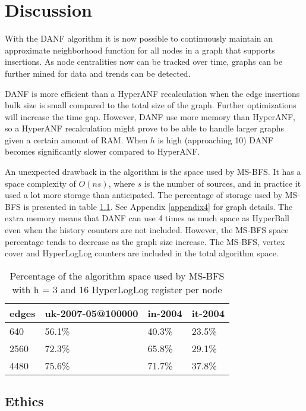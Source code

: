 \chapter{Discussion}
With the DANF algorithm it is now possible to continuously maintain an approximate neighborhood function for all nodes in a graph that supports insertions. As node centralities now can be tracked over time, graphs can be further mined for data and trends can be detected. 

DANF is more efficient than a HyperANF recalculation when the edge insertions bulk size is small compared to the total size of the graph. Further optimizations will increase the time gap. However, DANF use more memory than HyperANF, so a HyperANF recalculation might prove to be able to handle larger graphs given a certain amount of RAM. When $h$ is high (approaching 10) DANF becomes significantly slower compared to HyperANF.

An unexpected drawback in the algorithm is the space used by MS-BFS. It has a space complexity of $O(ns)$, where $s$ is the number of sources, and in practice it used a lot more storage than anticipated. The percentage of storage used by MS-BFS is presented in table \ref{table:ms-bfs_space}. See Appendix \ref{appendix4} for graph details. The extra memory means that DANF can use 4 times as much space as HyperBall even when the history counters are not included. However, the MS-BFS space percentage tends to decrease as the graph size increase. The MS-BFS, vertex cover and HyperLogLog counters are included in the total algorithm space.

\begin{table}[h]
    \center
    \begin{tabular}{ | l | l | l | l |}
        \hline
        edges & uk-2007-05@100000 & in-2004 & it-2004 \\ \hline
        640  & 56.1\% & 40.3\% & 23.5\% \\ \hline
        2560 & 72.3\% & 65.8\% & 29.1\% \\ \hline 
        4480 & 75.6\% & 71.7\% & 37.8\% \\
        \hline
    \end{tabular}
    \captionsetup{justification=centering}
    \caption{Percentage of the algorithm space used by MS-BFS with h = 3 and 16 HyperLogLog register per node}
    \label{table:ms-bfs_space}
\end{table}

\section{Ethics}


